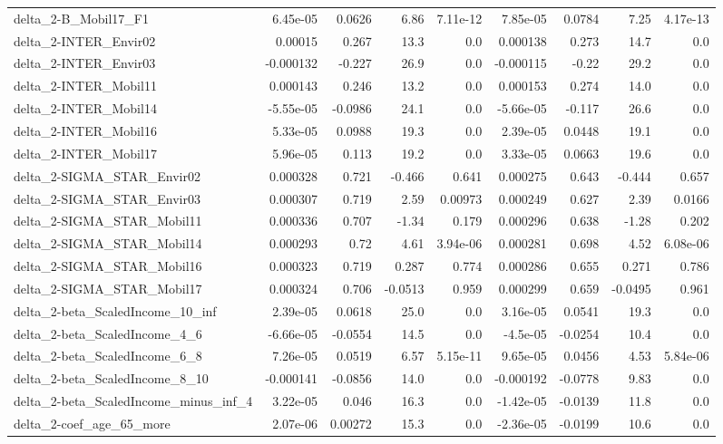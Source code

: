 \begin{tabular}{lrrrrrrrr}
delta_2-B_Mobil17_F1 & 6.45e-05 & 0.0626 & 6.86 & 7.11e-12 & 7.85e-05 & 0.0784 & 7.25 & 4.17e-13 \\
delta_2-INTER_Envir02 & 0.00015 & 0.267 & 13.3 & 0.0 & 0.000138 & 0.273 & 14.7 & 0.0 \\
delta_2-INTER_Envir03 & -0.000132 & -0.227 & 26.9 & 0.0 & -0.000115 & -0.22 & 29.2 & 0.0 \\
delta_2-INTER_Mobil11 & 0.000143 & 0.246 & 13.2 & 0.0 & 0.000153 & 0.274 & 14.0 & 0.0 \\
delta_2-INTER_Mobil14 & -5.55e-05 & -0.0986 & 24.1 & 0.0 & -5.66e-05 & -0.117 & 26.6 & 0.0 \\
delta_2-INTER_Mobil16 & 5.33e-05 & 0.0988 & 19.3 & 0.0 & 2.39e-05 & 0.0448 & 19.1 & 0.0 \\
delta_2-INTER_Mobil17 & 5.96e-05 & 0.113 & 19.2 & 0.0 & 3.33e-05 & 0.0663 & 19.6 & 0.0 \\
delta_2-SIGMA_STAR_Envir02 & 0.000328 & 0.721 & -0.466 & 0.641 & 0.000275 & 0.643 & -0.444 & 0.657 \\
delta_2-SIGMA_STAR_Envir03 & 0.000307 & 0.719 & 2.59 & 0.00973 & 0.000249 & 0.627 & 2.39 & 0.0166 \\
delta_2-SIGMA_STAR_Mobil11 & 0.000336 & 0.707 & -1.34 & 0.179 & 0.000296 & 0.638 & -1.28 & 0.202 \\
delta_2-SIGMA_STAR_Mobil14 & 0.000293 & 0.72 & 4.61 & 3.94e-06 & 0.000281 & 0.698 & 4.52 & 6.08e-06 \\
delta_2-SIGMA_STAR_Mobil16 & 0.000323 & 0.719 & 0.287 & 0.774 & 0.000286 & 0.655 & 0.271 & 0.786 \\
delta_2-SIGMA_STAR_Mobil17 & 0.000324 & 0.706 & -0.0513 & 0.959 & 0.000299 & 0.659 & -0.0495 & 0.961 \\
delta_2-beta_ScaledIncome_10_inf & 2.39e-05 & 0.0618 & 25.0 & 0.0 & 3.16e-05 & 0.0541 & 19.3 & 0.0 \\
delta_2-beta_ScaledIncome_4_6 & -6.66e-05 & -0.0554 & 14.5 & 0.0 & -4.5e-05 & -0.0254 & 10.4 & 0.0 \\
delta_2-beta_ScaledIncome_6_8 & 7.26e-05 & 0.0519 & 6.57 & 5.15e-11 & 9.65e-05 & 0.0456 & 4.53 & 5.84e-06 \\
delta_2-beta_ScaledIncome_8_10 & -0.000141 & -0.0856 & 14.0 & 0.0 & -0.000192 & -0.0778 & 9.83 & 0.0 \\
delta_2-beta_ScaledIncome_minus_inf_4 & 3.22e-05 & 0.046 & 16.3 & 0.0 & -1.42e-05 & -0.0139 & 11.8 & 0.0 \\
delta_2-coef_age_65_more & 2.07e-06 & 0.00272 & 15.3 & 0.0 & -2.36e-05 & -0.0199 & 10.6 & 0.0 \\

\end{tabular}
